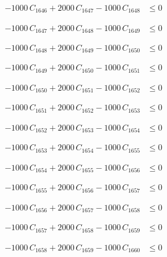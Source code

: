 \documentclass[a4paper,11pt]{article}
\begin{document}
\begin{align}
-1000\,C_{1646} + 2000\,C_{1647} - 1000\,C_{1648} &\leq 0 \nonumber
\end{align}

\begin{align}
-1000\,C_{1647} + 2000\,C_{1648} - 1000\,C_{1649} &\leq 0 \nonumber
\end{align}

\begin{align}
-1000\,C_{1648} + 2000\,C_{1649} - 1000\,C_{1650} &\leq 0 \nonumber
\end{align}

\begin{align}
-1000\,C_{1649} + 2000\,C_{1650} - 1000\,C_{1651} &\leq 0 \nonumber
\end{align}

\begin{align}
-1000\,C_{1650} + 2000\,C_{1651} - 1000\,C_{1652} &\leq 0 \nonumber
\end{align}

\begin{align}
-1000\,C_{1651} + 2000\,C_{1652} - 1000\,C_{1653} &\leq 0 \nonumber
\end{align}

\begin{align}
-1000\,C_{1652} + 2000\,C_{1653} - 1000\,C_{1654} &\leq 0 \nonumber
\end{align}

\begin{align}
-1000\,C_{1653} + 2000\,C_{1654} - 1000\,C_{1655} &\leq 0 \nonumber
\end{align}

\begin{align}
-1000\,C_{1654} + 2000\,C_{1655} - 1000\,C_{1656} &\leq 0 \nonumber
\end{align}

\begin{align}
-1000\,C_{1655} + 2000\,C_{1656} - 1000\,C_{1657} &\leq 0 \nonumber
\end{align}

\begin{align}
-1000\,C_{1656} + 2000\,C_{1657} - 1000\,C_{1658} &\leq 0 \nonumber
\end{align}

\begin{align}
-1000\,C_{1657} + 2000\,C_{1658} - 1000\,C_{1659} &\leq 0 \nonumber
\end{align}

\begin{align}
-1000\,C_{1658} + 2000\,C_{1659} - 1000\,C_{1660} &\leq 0 \nonumber
\end{align}
\end{document}
